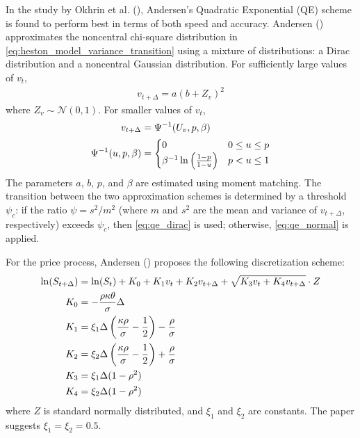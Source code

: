 In the study by Okhrin et al. (\citeyear{okhrinSimulatingCoxIngersoll2022}), Andersen's Quadratic Exponential (QE) scheme is found to perform best in terms of both speed and accuracy. Andersen (\citeyear{andersenEfficientSimulationHeston2007}) approximates the noncentral chi-square distribution in \eqref{eq:heston_model_variance_transition} using a mixture of distributions: a Dirac distribution and a noncentral Gaussian distribution. For sufficiently large values of $v_t$,
\begin{align}
    \label{eq:qe_normal}
    v_{t+\Delta} = a(b+Z_v)^2
\end{align}
where $Z_v \sim \mathcal{N}(0,1)$. For smaller values of $v_t$,
\begin{align}
    \label{eq:qe_dirac}
    v_{t+\Delta} &= \Psi^{-1}(U_v, p, \beta) \\
    \Psi^{-1}(u,p,\beta) &= \begin{cases}
        0 & 0\le u\le p \\
        \beta^{-1}\ln\left(\frac{1-p}{1-u}\right) & p<u\le 1
    \end{cases} \notag
\end{align}
The parameters $a$, $b$, $p$, and $\beta$ are estimated using moment matching. The transition between the two approximation schemes is determined by a threshold $\psi_c$: if the ratio $\psi = s^2 / m^2$ (where $m$ and $s^2$ are the mean and variance of $v_{t+\Delta}$, respectively) exceeds $\psi_c$, then \eqref{eq:qe_dirac} is used; otherwise, \eqref{eq:qe_normal} is applied.

For the price process, Andersen (\citeyear{andersenEfficientSimulationHeston2007}) proposes the following discretization scheme:
\begin{align}
    \ln(S_{t+\Delta}) &= \ln(S_t) + K_0 + K_1v_t + K_2v_{t+\Delta} + \sqrt{K_3v_t + K_4v_{t+\Delta}}\cdot Z \notag \\
    K_0 &= -\frac{\rho\kappa\theta}{\sigma}\Delta \notag \\
    K_1 &= \xi_1\Delta\left(\frac{\kappa\rho}{\sigma} - \frac{1}{2}\right)-\frac{\rho}{\sigma} \notag \\
    K_2 &= \xi_2\Delta\left(\frac{\kappa\rho}{\sigma}-\frac{1}{2}\right)+\frac{\rho}{\sigma} \notag \\
    K_3 &= \xi_1\Delta(1-\rho^2) \notag \\
    K_4 &= \xi_2\Delta(1-\rho^2) \notag
\end{align}
where $Z$ is standard normally distributed, and $\xi_1$ and $\xi_2$ are constants. The paper suggests $\xi_1 = \xi_2 = 0.5$.